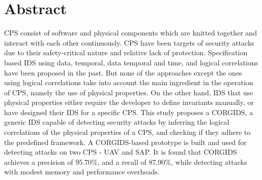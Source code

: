 
\chapter{Abstract}

 \ac{CPS} consist of software and physical components which are knitted together and interact with each other continuously. \ac{CPS} have been targets of security attacks due to their safety-critical nature and relative lack of protection. Specification based \ac{IDS} using data, temporal, data temporal and time, and logical correlations have been proposed in the past. But none of the approaches except the ones using logical correlations take into account the main ingredient in the operation of \ac{CPS}, namely the use of physical properties. On the other hand, \ac{IDS} that use physical properties either require the developer to define invariants manually, or have designed their \ac{IDS} for a specific \ac{CPS}. This study proposes a \ac{CORGIDS}, a generic \ac{IDS} capable of detecting security attacks by inferring the logical correlations of the physical properties of a \ac{CPS}, and checking if they adhere to the predefined framework. A \ac{CORGIDS}-based prototype is built and used for detecting attacks on two \ac{CPS} - \ac{UAV} and \ac{SAP}. It is found that \ac{CORGIDS} achieves a precision of  95.70\%, and a recall of 87.90\%, while detecting attacks with modest memory and performance overheads.

